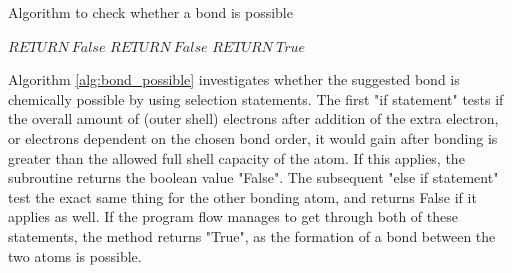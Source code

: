 \documentclass[a4paper,12pt]{article}
\begin{document}
\begin{center}
\end{center}

\begin{algorithm}
\footnotesize
\caption{Algorithm to check whether a bond is possible}\label{alg:bond_possible}
\begin{algorithmic}
	\State $ RETURN\ False$
	\State $ RETURN\ False$
\Else 
	\State $ RETURN\ True$
\EndIf
\EndFunction
\end{algorithmic}
\end{algorithm}

Algorithm \ref{alg:bond_possible} investigates whether the suggested bond is chemically possible by using selection statements. The first "if statement" tests if the overall amount of (outer shell) electrons after addition of the extra electron, or electrons dependent on the chosen bond order, it would gain after bonding is greater than the allowed full shell capacity of the atom. If this applies, the subroutine returns the boolean value "False". The subsequent "else if statement" test the exact same thing for the other bonding atom, and returns False if it applies as well. If the program flow manages to get through both of these statements, the method returns "True", as the formation of a bond between the two atoms is possible.
\end{document}
